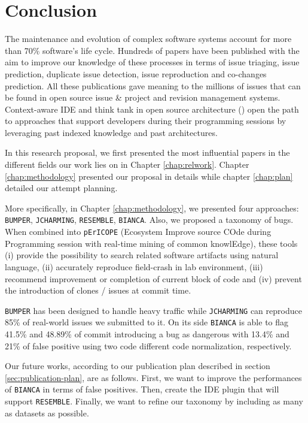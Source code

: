 
\chapter{Conclusion\label{chap:conclusion}}

The maintenance and evolution of complex software systems account for more than 70\% software's life cycle.
Hundreds of papers have been published with the aim to improve our knowledge of these processes in terms of issue triaging, issue prediction, duplicate issue detection, issue reproduction and co-changes prediction.
All these publications gave meaning to the millions of issues that can be found in open source issue \& project and revision management systems.
Context-aware IDE and think tank in open source architecture (\cite{chansler2011architecture}) open the path to approaches that support developers during their programming sessions by leveraging past indexed knowledge and past architectures.

In this research proposal, we first presented the most influential papers in the different fields our work lies on in Chapter \ref{chap:relwork}.
Chapter \ref{chap:methodology} presented our proposal in details while chapter \ref{chap:plan} detailed our attempt planning.

More specifically, in Chapter \ref{chap:methodology}, we presented four approaches: {\tt BUMPER}, {\tt JCHARMING}, {\tt RESEMBLE}, {\tt BIANCA}. Also, we proposed a taxonomy of bugs. When combined into {\tt pErICOPE} (Ecosystem Improve source COde during Programming session with real-time mining of common knowlEdge), these tools (i) provide the possibility to search related software artifacts using natural language, (ii) accurately reproduce field-crash in lab environment, (iii) recommend improvement or completion of current block of code and (iv) prevent the introduction of clones / issues at commit time.

{\tt BUMPER} has been designed to handle heavy traffic while {\tt JCHARMING} can reproduce 85\% of real-world issues we submitted to it. On its side {\tt BIANCA} is able to flag 41.5\% and 48.89\% of commit introducing a bug as dangerous with 13.4\% and 21\% of false positive using two code different code normalization, respectively.

Our future works, according to our publication plan described in section \ref{sec:publication-plan}, are as follows. First, we want to improve the performances of {\tt BIANCA} in terms of false positives.
Then, create the IDE plugin that will support {\tt RESEMBLE}. Finally, we want to refine our taxonomy by including as many as datasets as possible.

